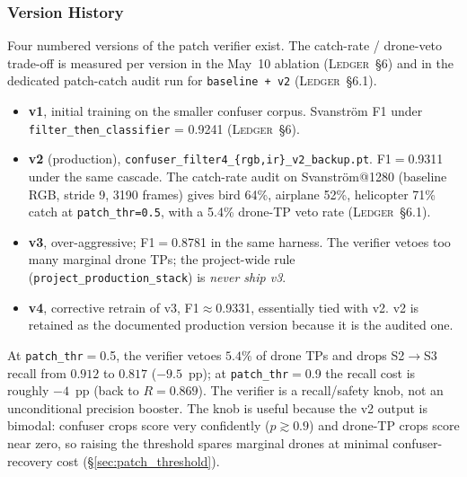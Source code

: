 \subsubsection{Version History}

Four numbered versions of the patch verifier exist. The catch-rate / drone-veto trade-off is measured per version in the May~10 ablation (\textsc{Ledger}~\S6) and in the dedicated patch-catch audit run for \texttt{baseline + v2} (\textsc{Ledger}~\S6.1).

\begin{itemize}
    \item \textbf{v1}, initial training on the smaller confuser corpus. Svanstr\"om F1 under \texttt{filter\_then\_classifier} = 0.9241 (\textsc{Ledger}~\S6).
    \item \textbf{v2} (production), \texttt{confuser\_filter4\_\{rgb,ir\}\_v2\_backup.pt}. F1$=$0.9311 under the same cascade. The catch-rate audit on Svanstr\"om@1280 (baseline RGB, stride 9, 3190 frames) gives bird 64\%, airplane 52\%, helicopter 71\% catch at \texttt{patch\_thr=0.5}, with a 5.4\% drone-TP veto rate (\textsc{Ledger}~\S6.1).
    \item \textbf{v3}, over-aggressive; F1$=$0.8781 in the same harness. The verifier vetoes too many marginal drone TPs; the project-wide rule (\texttt{project\_production\_stack}) is \emph{never ship v3}.
    \item \textbf{v4}, corrective retrain of v3, F1$\approx$0.9331, essentially tied with v2. v2 is retained as the documented production version because it is the audited one.
\end{itemize}

At \texttt{patch\_thr}$=$0.5, the verifier vetoes $5.4\%$ of drone TPs and drops S2$\to$S3 recall from $0.912$ to $0.817$ ($-9.5$~pp); at \texttt{patch\_thr}$=$0.9 the recall cost is roughly $-4$~pp (back to $R=0.869$). The verifier is a recall/safety knob, not an unconditional precision booster. The knob is useful because the v2 output is bimodal: confuser crops score very confidently ($p \gtrsim 0.9$) and drone-TP crops score near zero, so raising the threshold spares marginal drones at minimal confuser-recovery cost (\S\ref{sec:patch_threshold}).

